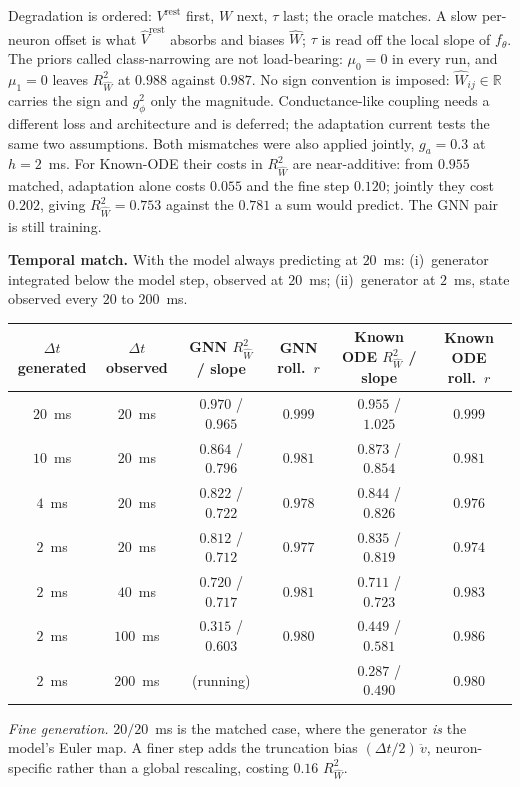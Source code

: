 \documentclass[11pt]{article}
\newcommand{\Rw}{R^2_{\widehat W}}
\begin{document}
Degradation is ordered: $V^{\mathrm{rest}}$ first, $W$ next, $\tau$ last; the
oracle matches. A slow per-neuron offset is what $\widehat V^{\mathrm{rest}}$
absorbs and biases $\widehat W$; $\tau$ is read off the local slope of $f_\theta$.
The priors called class-narrowing are not load-bearing: $\mu_0 = 0$ in every run,
and $\mu_1 = 0$ leaves $\Rw$ at $0.988$ against $0.987$. No sign convention is
imposed: $\widehat W_{ij} \in \mathbb{R}$ carries the sign and $g_\phi^2$ only the
magnitude. Conductance-like coupling needs a
different loss and architecture and is deferred; the adaptation current tests the
same two assumptions. Both mismatches were also applied jointly, $g_a = 0.3$ at
$h = 2$~ms. For Known-ODE their costs in $\Rw$ are near-additive: from $0.955$
matched, adaptation alone costs $0.055$ and the fine step $0.120$; jointly they
cost $0.202$, giving $\Rw = 0.753$ against the $0.781$ a sum would predict. The
GNN pair is still training.

\textbf{Temporal match.} With the model always predicting at $20$~ms:
(i)~generator integrated below the model step, observed at $20$~ms;
(ii)~generator at $2$~ms, state observed every $20$ to $200$~ms.

\begin{center}
{\footnotesize
\begin{tabular}{cccccc}
\toprule
$\Delta t$ generated & $\Delta t$ observed & GNN $\Rw$ / slope & GNN roll.\ $r$ & Known ODE $\Rw$ / slope & Known ODE roll.\ $r$ \\
\midrule
$20$~ms & $20$~ms  & $0.970$ / $0.965$ & $0.999$ & $0.955$ / $1.025$ & $0.999$ \\
$10$~ms & $20$~ms  & $0.864$ / $0.796$ & $0.981$ & $0.873$ / $0.854$ & $0.981$ \\
$4$~ms  & $20$~ms  & $0.822$ / $0.722$ & $0.978$ & $0.844$ / $0.826$ & $0.976$ \\
$2$~ms  & $20$~ms  & $0.812$ / $0.712$ & $0.977$ & $0.835$ / $0.819$ & $0.974$ \\
\midrule
$2$~ms  & $40$~ms  & $0.720$ / $0.717$ & $0.981$ & $0.711$ / $0.723$ & $0.983$ \\
$2$~ms  & $100$~ms & $0.315$ / $0.603$ & $0.980$ & $0.449$ / $0.581$ & $0.986$ \\
$2$~ms  & $200$~ms & (running)         &         & $0.287$ / $0.490$ & $0.980$ \\
\bottomrule
\end{tabular}}
\end{center}

\emph{Fine generation.} $20/20$~ms is the matched case, where the generator
\emph{is} the model's Euler map. A finer step adds the truncation bias
$(\Delta t/2)\,\ddot v$, neuron-specific rather than a global rescaling, costing
$0.16$ $\Rw$.
\end{document}
